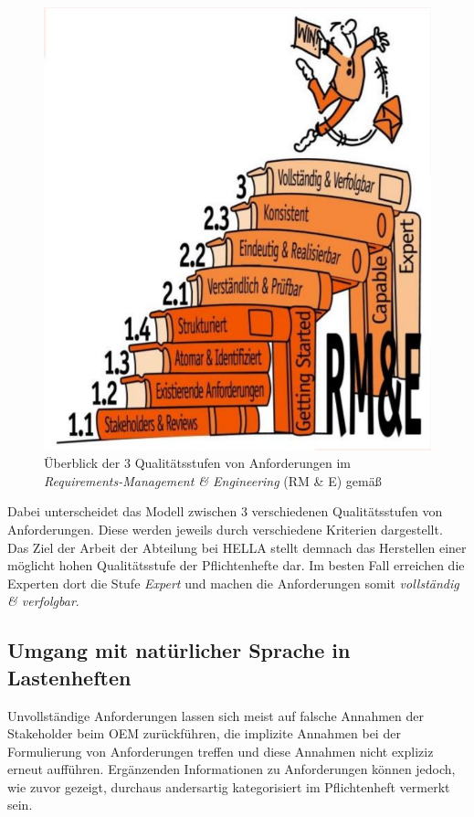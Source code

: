 \documentclass[12pt]{report}
\begin{document}
\begin{figure}[h!]
\begin{center}
\includegraphics[scale=0.5]{Bilder/HOOD-RE.jpg}
\caption{Überblick der 3 Qualitätsstufen von Anforderungen im \textit{Requirements-Management \& Engineering} (RM \& E) gemäß \cite{hp12}}
\end{center}
\end{figure}

Dabei unterscheidet das Modell zwischen 3 verschiedenen Qualitätsstufen von Anforderungen. Diese werden jeweils durch verschiedene Kriterien dargestellt. Das Ziel der Arbeit der Abteilung bei HELLA stellt demnach das Herstellen einer möglicht hohen Qualitätsstufe der Pflichtenhefte dar. Im besten Fall erreichen die Experten dort die Stufe \textit{Expert} und machen die Anforderungen somit \textit{vollständig \& verfolgbar}.

\subsection{Umgang mit natürlicher Sprache in Lastenheften}
Unvollständige Anforderungen lassen sich meist auf falsche Annahmen der Stakeholder beim OEM zurückführen, die implizite Annahmen bei der Formulierung von Anforderungen treffen und diese Annahmen nicht expliziz erneut aufführen. Ergänzenden Informationen zu Anforderungen können jedoch, wie zuvor gezeigt, durchaus andersartig kategorisiert im Pflichtenheft vermerkt sein. 
\end{document}

